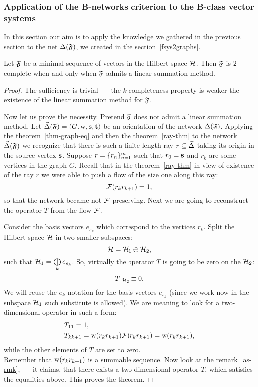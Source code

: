 \documentclass[12pt]{article}
\begin{document}
    \subsubsection{Application of the B-networks criterion to the B-class vector systems}
      In this section our aim is to apply the knowledge we gathered in the previous section to
      the net $\net(\fsys)$, we created in the section~\ref{fsys2graphs}.
      \begin{theorem}
        \label{completeness-thm}
        Let $\fsys$ be a minimal sequence of vectors in the Hilbert space $\cal{H}$.
        Then $\fsys$ is $2$-complete when and only when $\fsys$ admits a linear summation method.
      \end{theorem}
      \begin{proof}
        The sufficiency is trivial~--- the $k$-completeness property is weaker the existence of the linear summation method
          for $\fsys$.

        Now let us prove the necessity.
        Pretend $\fsys$ does not admit a linear summation method.
        Let $\onet(\fsys) = (G, \wtp, \source, \sink)$ be an orientation of the network $\net(\fsys)$.
        Applying the theorem~\ref{thm-graph-eq} and then the theorem~\ref{ray-thm} to the network $\onet(\fsys)$
          we recognize that there is such a finite-length ray $r \subseteq \onet$ taking its origin
          in the source vertex $\source$.
        Suppose $r = \seq{r}$ such that $r_0 = \source$ and $r_k$ are some vertices in the graph $G$.
        Recall that in the theorem~\ref{ray-thm} in view of existence of the ray $r$ we were able to push
          a flow of the size one along this ray:
        \[
          \flowpos(r_k r_{k+1}) = 1,
        \]
        so that the network became not $\flowpos$-preserving.
        Next we are going to reconstruct the operator $T$ from the flow $\flowpos$.

        Consider the basis vectors $e_{s_k}$ which correspond to the vertices $r_k$.
        Split the Hilbert space $\cal{H}$ in two smaller subspaces:
        \[
          \cal{H} = \cal{H}_1 \oplus \cal{H}_2,
        \]
        such that $\cal{H}_1 = \bigoplus\limits_k e_{s_k}$.
        So, virtually the operator $T$ is going to be zero on the $\cal{H}_2$:
        \[
          T\vert_{\cal{H}_2} \equiv 0.
        \]
        We will reuse the $e_k$ notation for the basis vectors $e_{s_k}$ (since we work now in the subspace $\cal{H}_1$
          such substitute is allowed).
        We are meaning to look for a two-dimensional operator in such a form:
        \begin{align*}
          &T_{11} = 1,\\
          &T_{k k+1} = \wtp(r_k r_{k+1}) \flowpos(r_k r_{k+1}) = \wtp(r_k r_{k+1}),
        \end{align*}
        while the other elements of $T$ are set to zero.\\
        Remember that $\wtp(r_k r_{k+1})$ is a summable sequence.
        Now look at the remark~\ref{as-rmk},~--- it claims, that there exists a two-dimensional operator $T$, which satisfies the equalities above.
        This proves the theorem.
    \end{proof}
\end{document}
